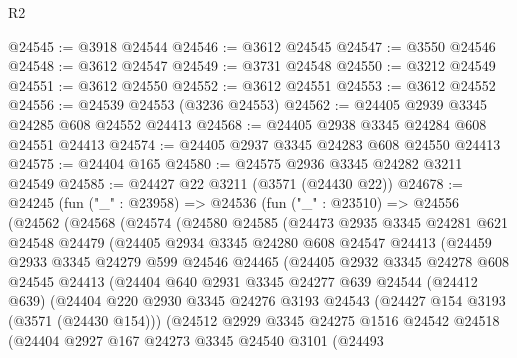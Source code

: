 \begin{lexlean}{R2}
\begin{coremodule}
@24545 := @3918 @24544
@24546 := @3612 @24545
@24547 := @3550 @24546
@24548 := @3612 @24547
@24549 := @3731 @24548
@24550 := @3212 @24549
@24551 := @3612 @24550
@24552 := @3612 @24551
@24553 := @3612 @24552
@24556 := @24539 @24553 (@3236 @24553)
@24562 := @24405 @2939 @3345 @24285 @608 @24552 @24413
@24568 := @24405 @2938 @3345 @24284 @608 @24551 @24413
@24574 := @24405 @2937 @3345 @24283 @608 @24550 @24413
@24575 := @24404 @165
@24580 := @24575 @2936 @3345 @24282 @3211 @24549
@24585 := @24427 @22 @3211 (@3571 (@24430 @22))
@24678 := @24245
    (fun ("_" : @23958) =>
    @24536
      (fun ("_" : @23510) =>
      @24556
        (@24562
          (@24568
            (@24574
              (@24580
                @24585
                (@24473
                  @2935
                  @3345
                  @24281
                  @621
                  @24548
                  @24479
                  (@24405
                    @2934
                    @3345
                    @24280
                    @608
                    @24547
                    @24413
                    (@24459
                      @2933
                      @3345
                      @24279
                      @599
                      @24546
                      @24465
                      (@24405
                        @2932
                        @3345
                        @24278
                        @608
                        @24545
                        @24413
                        (@24404
                          @640
                          @2931
                          @3345
                          @24277
                          @639
                          @24544
                          (@24412 @639)
                          (@24404
                            @220
                            @2930
                            @3345
                            @24276
                            @3193
                            @24543
                            (@24427 @154 @3193 (@3571 (@24430 @154)))
                            (@24512
                              @2929
                              @3345
                              @24275
                              @1516
                              @24542
                              @24518
                              (@24404
                                @2927
                                @167
                                @24273
                                @3345
                                @24540
                                @3101
                                (@24493

\end{coremodule}
\end{lexlean}
